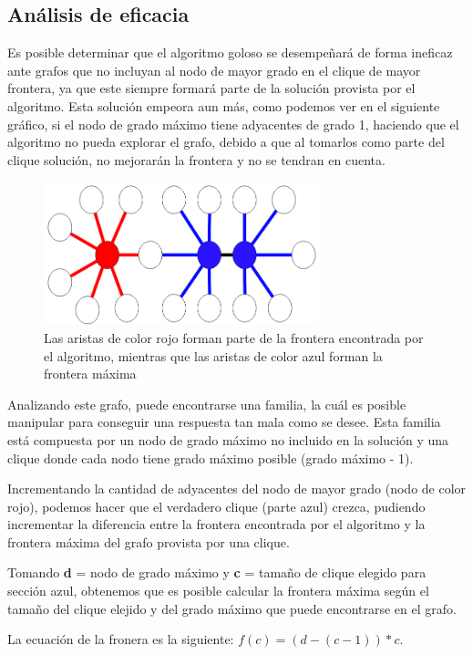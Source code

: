 \documentclass[a4paper, 10pt, twoside]{article}
\begin{document}
\subsection{Análisis de eficacia}
Es posible determinar que el algoritmo goloso se desempeñará de forma ineficaz ante grafos que no incluyan al nodo de mayor grado en el clique de mayor frontera, ya que este siempre formará parte de la solución provista por el algoritmo. Esta solución empeora aun más, como podemos ver en el siguiente gráfico, si el nodo de grado máximo tiene adyacentes de grado 1, haciendo que el algoritmo no pueda explorar el grafo, debido a que al tomarlos como parte del clique solución, no mejorarán la frontera y no se tendran en cuenta.

\begin{figure}[H]
\includegraphics[width=80mm]{ejemploErrorGoloso.png}
\caption{Las aristas de color rojo forman parte de la frontera encontrada por el algoritmo, mientras que las aristas de color azul forman la frontera máxima}
\label{overflow}
\end{figure}

Analizando este grafo, puede encontrarse una familia, la cuál es posible manipular para conseguir una respuesta tan mala como se desee. Esta familia está compuesta por un nodo de grado máximo no incluido en la solución y una clique donde cada nodo tiene grado máximo posible (grado máximo - 1).

Incrementando la cantidad de adyacentes del nodo de mayor grado (nodo de color rojo), podemos hacer que el verdadero clique (parte azul) crezca, pudiendo incrementar la diferencia entre la frontera encontrada por el algoritmo y la frontera máxima del grafo provista por una clique.

Tomando \textbf{d} = nodo de grado máximo y \textbf{c} = tamaño de clique elegido para sección azul, obtenemos que es posible calcular la frontera máxima según el tamaño del clique elejido y del grado máximo que puede encontrarse en el grafo.

La ecuación de la fronera es la siguiente: $f(c) = (d - (c - 1)) * c$.
\end{document}
